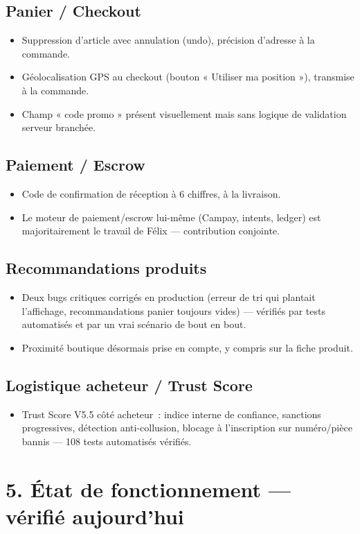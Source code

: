 \documentclass[11pt]{article}
\newcommand{\fait}[1]{\item[\textcolor{okgreen}{\textbf{\checkmark}}] #1}
\newcommand{\reste}[1]{\item[\textcolor{warnred}{\textbf{!}}] #1}
\newcommand{\info}[1]{\item[\textcolor{graytext}{\textbf{i}}] #1}
\begin{document}
\subsection*{Panier / Checkout}
\begin{itemize}
\fait{Suppression d'article avec annulation (undo), précision d'adresse à la commande.}
\fait{Géolocalisation GPS au checkout (bouton « Utiliser ma position »), transmise à la commande.}
\reste{Champ « code promo » présent visuellement mais sans logique de validation serveur branchée.}
\end{itemize}

\subsection*{Paiement / Escrow}
\begin{itemize}
\fait{Code de confirmation de réception à 6 chiffres, à la livraison.}
\info{Le moteur de paiement/escrow lui-même (Campay, intents, ledger) est majoritairement le travail de Félix — contribution conjointe.}
\end{itemize}

\subsection*{Recommandations produits}
\begin{itemize}
\fait{Deux bugs critiques corrigés en production (erreur de tri qui plantait l'affichage, recommandations panier toujours vides) — vérifiés par tests automatisés et par un vrai scénario de bout en bout.}
\fait{Proximité boutique désormais prise en compte, y compris sur la fiche produit.}
\end{itemize}

\subsection*{Logistique acheteur / Trust Score}
\begin{itemize}
\fait{Trust Score V5.5 côté acheteur~: indice interne de confiance, sanctions progressives, détection anti-collusion, blocage à l'inscription sur numéro/pièce bannis — 108 tests automatisés vérifiés.}
\end{itemize}

\newpage
\section*{5. État de fonctionnement — vérifié aujourd'hui}
\end{document}
